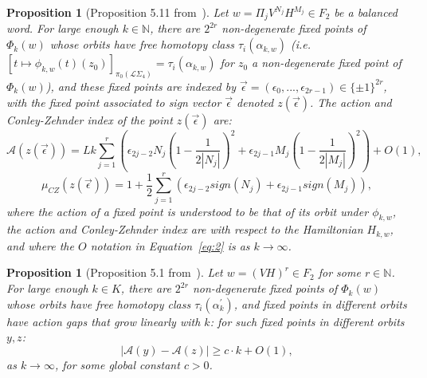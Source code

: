\documentclass[11pt]{article}
\newtheorem{prop}[theorem]{Proposition}
\newcommand{\N}{\mathbb{N}}
\begin{document}
            \begin{prop}[Proposition 5.11 from~\cite{10}]
            \label{prop:main}
                Let $w = \Pi_j V^{N_j} H^{M_j} \in F_2$ be a balanced word. For large enough $k \in \N$, there are $2^{2r}$ non-degenerate fixed points of $\Phi_k(w)$ whose orbits have free homotopy class $\tau_i(\alpha_{k,w})$ (i.e. $[t \mapsto \phi_{k,w}(t)(z_0)]_{\pi_0(\mathscr{L}\Sigma_4)} = \tau_i(\alpha_{k,w})$ for $z_0$ a non-degenerate fixed point of $\Phi_k(w)$), and these fixed points are indexed by $\vec{\epsilon} = (\epsilon_0,...,\epsilon_{2r-1}) \in \{\pm 1\}^{2r}$, with the fixed point associated to sign vector $\vec{\epsilon}$ denoted $z(\vec{\epsilon})$. The action and Conley-Zehnder index of the point $z(\vec\epsilon)$ are:
                \begin{equation}
                \label{eq:2}
                    \mathcal{A}(z(\vec{\epsilon})) = Lk \sum_{j=1}^r \left( \epsilon_{2j-2} N_j \left(1-\frac{1}{2|N_j|}\right)^2 + \epsilon_{2j-1} M_j \left(1-\frac{1}{2|M_j|}\right)^2 \right) + O(1) ,
                \end{equation}
                \begin{equation}
                \label{eq:3}
                    \mu_{CZ}(z(\vec\epsilon)) = 1 + \frac12 \sum_{j=1}^r \left( \epsilon_{2j-2} sign(N_j) + \epsilon_{2j-1} sign(M_j) \right) ,
                \end{equation}
                where the action of a fixed point is understood to be that of its orbit under $\phi_{k,w}$, the action and Conley-Zehnder index are with respect to the Hamiltonian $H_{k,w}$, and where the $O$ notation in Equation~\ref{eq:2} is as $k \to \infty$.
            \end{prop}
            
            \begin{prop}[Proposition 5.1 from~\cite{PS14}]
            \label{prop:main2}
                Let $w = (VH)^r \in F_2$ for some $r \in \N$. For large enough $k \in K$, there are $2^{2r}$ non-degenerate fixed points of $\Phi_k(w)$ whose orbits have free homotopy class $\tau_i(\alpha_k^\prime)$, and fixed points in different orbits have action gaps that grow linearly with $k$: for such fixed points in different orbits $y, z$:
                \[
                    | \mathcal{A}(y) - \mathcal{A}(z) | \geq c \cdot k + O(1) ,
                \]
                as $k \to \infty$, for some global constant $c > 0$.
            \end{prop}
            
\end{document}
